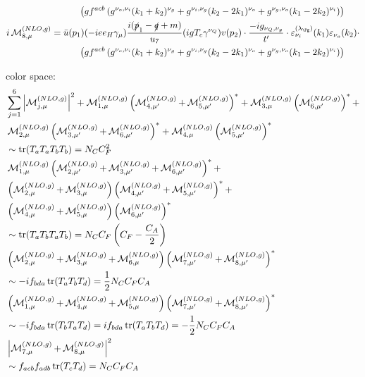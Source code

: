 \begin{align}
 &\hspace{30pt}\left(gf^{acb}\left(g^{\nu_o,\nu_i}(k_1+k_2)^{\nu_g}+g^{\nu_i,\nu_g}(k_2-2k_1)^{\nu_o}+g^{\nu_g,\nu_o}(k_1-2k_2)^{\nu_i}\right)\right)\\
i\Md^{(NLO,g)}_{8,\mu} &= \bar u(p_1)(-i e e_H \gamma_\mu)\frac{i(\slashed{p}_1-\slashed{q}+m)}{u_7}(igT_c\gamma^{\nu_Q})v(p_2)\cdot\frac{-ig_{\nu_Q,\nu_g}}{t'}\cdot\varepsilon^{(\lambda_{\Pg})}_{\nu_i}(k_1)\varepsilon_{\nu_o}(k_2)\cdot\nonumber\\
 &\hspace{30pt}\left(gf^{acb}\left(g^{\nu_o,\nu_i}(k_1+k_2)^{\nu_g}+g^{\nu_i,\nu_g}(k_2-2k_1)^{\nu_o}+g^{\nu_g,\nu_o}(k_1-2k_2)^{\nu_i}\right)\right)
\end{align}

color space:
\begin{align}
&\sum\limits_{j=1}^6\left|\operatorname{\mathcal M}^{(NLO,g)}_{j,\mu}\right|^2 + \operatorname{\mathcal M}^{(NLO,g)}_{1,\mu}\left(\operatorname{\mathcal M}^{(NLO,g)}_{4,\mu'}+\operatorname{\mathcal M}^{(NLO,g)}_{5,\mu'}\right)^*+\operatorname{\mathcal M}^{(NLO,g)}_{3,\mu}\left(\operatorname{\mathcal M}^{(NLO,g)}_{6,\mu'}\right)^*+\nonumber\\
&\operatorname{\mathcal M}^{(NLO,g)}_{2,\mu}\left(\operatorname{\mathcal M}^{(NLO,g)}_{3,\mu'}+\operatorname{\mathcal M}^{(NLO,g)}_{6,\mu'}\right)^*+\operatorname{\mathcal M}^{(NLO,g)}_{4,\mu}\left(\operatorname{\mathcal M}^{(NLO,g)}_{5,\mu'}\right)^*\nonumber\\
&\sim\operatorname{\text{tr}}(T_aT_aT_bT_b) = N_C C_F^2\\
&\operatorname{\mathcal M}^{(NLO,g)}_{1,\mu}\left(\operatorname{\mathcal M}^{(NLO,g)}_{2,\mu'}+\operatorname{\mathcal M}^{(NLO,g)}_{3,\mu'}+\operatorname{\mathcal M}^{(NLO,g)}_{6,\mu'}\right)^*+\nonumber\\
&\left(\operatorname{\mathcal M}^{(NLO,g)}_{2,\mu}+\operatorname{\mathcal M}^{(NLO,g)}_{3,\mu}\right)\left(\operatorname{\mathcal M}^{(NLO,g)}_{4,\mu'}+\operatorname{\mathcal M}^{(NLO,g)}_{5,\mu'}\right)^*+\nonumber\\
&\left(\operatorname{\mathcal M}^{(NLO,g)}_{4,\mu}+\operatorname{\mathcal M}^{(NLO,g)}_{5,\mu}\right)\left(\operatorname{\mathcal M}^{(NLO,g)}_{6,\mu'}\right)^*\nonumber\\
&\sim\operatorname{\text{tr}}(T_aT_bT_aT_b) = N_C C_F \left(C_F - \frac{C_A}{2}\right)\\
&\left(\operatorname{\mathcal M}^{(NLO,g)}_{2,\mu}+\operatorname{\mathcal M}^{(NLO,g)}_{3,\mu}+\operatorname{\mathcal M}^{(NLO,g)}_{6,\mu}\right)\left(\operatorname{\mathcal M}^{(NLO,g)}_{7,\mu'}+\operatorname{\mathcal M}^{(NLO,g)}_{8,\mu'}\right)^*\nonumber\\
&\sim-if_{bda}\operatorname{\text{tr}}(T_aT_bT_d) = \frac 1 2 N_C C_F C_A\\
&\left(\operatorname{\mathcal M}^{(NLO,g)}_{1,\mu}+\operatorname{\mathcal M}^{(NLO,g)}_{4,\mu}+\operatorname{\mathcal M}^{(NLO,g)}_{5,\mu}\right)\left(\operatorname{\mathcal M}^{(NLO,g)}_{7,\mu'}+\operatorname{\mathcal M}^{(NLO,g)}_{8,\mu'}\right)^*\nonumber\\
&\sim-if_{bda}\operatorname{\text{tr}}(T_bT_aT_d) = if_{bda}\operatorname{\text{tr}}(T_aT_bT_d)=-\frac 1 2 N_C C_F C_A\\
&\left|\operatorname{\mathcal M}^{(NLO,g)}_{7,\mu}+\operatorname{\mathcal M}^{(NLO,g)}_{8,\mu}\right|^2 \nonumber\\
&\sim f_{acb}f_{adb}\operatorname{\text{tr}}(T_cT_d) = N_C C_F C_A
\end{align}

